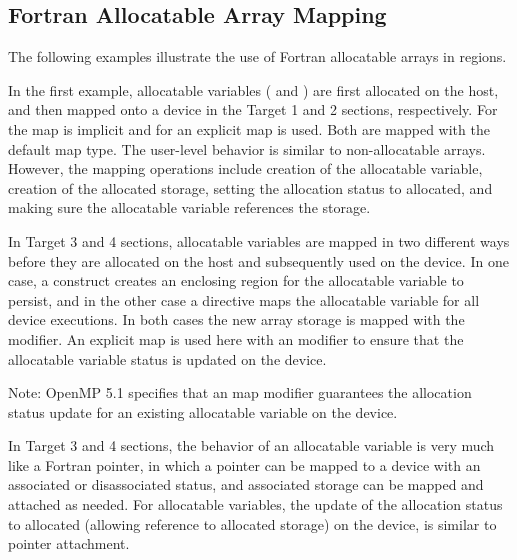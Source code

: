 \pagebreak
\begin{fortranspecific}[4ex]
\section{Fortran Allocatable Array Mapping}
\label{sec:fort_allocatable_array_mapping}


The following examples illustrate the use of Fortran allocatable arrays in  regions.

In the first example, allocatable variables ( and ) are first allocated
on the host, and then mapped onto a device in the Target 1 and 2 sections, respectively.
For  the map is implicit and for  an explicit map is used.
Both are mapped with the default  map type.
The user-level behavior is similar to non-allocatable arrays.
However, the mapping operations include creation of the allocatable variable,
creation of the allocated storage, setting the allocation status to allocated,
and making sure the allocatable variable references the storage.

In Target 3 and 4 sections, allocatable variables are mapped in two
different ways before they are allocated on the host and subsequently used on the device.
In one case, a  construct creates an enclosing region for
the allocatable variable to persist, and in the other case a
 directive maps the allocatable variable for all device executions.
In both cases the new array storage is mapped  with the  modifier.
An explicit map is used here with an  modifier to ensure that the allocatable
variable status is updated on the device.

Note: OpenMP 5.1 specifies that an  map modifier guarantees the
allocation status update for an existing allocatable variable on the device.

In Target 3 and 4 sections, the behavior of an allocatable variable is very
much like a Fortran pointer, in which a pointer can be mapped to a device with an associated
or disassociated status, and associated storage can be mapped and attached as needed.
For allocatable variables, the update of the allocation status to allocated (allowing
reference to allocated storage) on the device, is similar to pointer attachment.


\end{fortranspecific}
